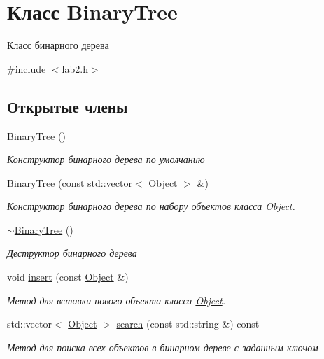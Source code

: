 \hypertarget{classBinaryTree}{}\section{Класс Binary\+Tree}
\label{classBinaryTree}


Класс бинарного дерева  




{\ttfamily \#include $<$lab2.\+h$>$}

\subsection*{Открытые члены}
\begin{DoxyCompactItemize}
\item 
\mbox{\label{classBinaryTree_adf45bce605436b26c353b87e27bffe50}} 
\mbox{\hyperlink{classBinaryTree_adf45bce605436b26c353b87e27bffe50}{Binary\+Tree}} ()
\begin{DoxyCompactList}\small\item\em Конструктор бинарного дерева по умолчанию \end{DoxyCompactList}\item 
\mbox{\hyperlink{classBinaryTree_a40a2af97186493b6bad3ee90e9a9c425}{Binary\+Tree}} (const std\+::vector$<$ \mbox{\hyperlink{structObject}{Object}} $>$ \&)
\begin{DoxyCompactList}\small\item\em Конструктор бинарного дерева по набору объектов класса \mbox{\hyperlink{structObject}{Object}}. \end{DoxyCompactList}\item 
\mbox{\label{classBinaryTree_a48c23a22a8400765d099e0e6fcebc236}} 
\mbox{\hyperlink{classBinaryTree_a48c23a22a8400765d099e0e6fcebc236}{$\sim$\+Binary\+Tree}} ()
\begin{DoxyCompactList}\small\item\em Деструктор бинарного дерева \end{DoxyCompactList}\item 
void \mbox{\hyperlink{classBinaryTree_af3d8f80f5451cbacb0338fa533d135ac}{insert}} (const \mbox{\hyperlink{structObject}{Object}} \&)
\begin{DoxyCompactList}\small\item\em Метод для вставки нового объекта класса \mbox{\hyperlink{structObject}{Object}}. \end{DoxyCompactList}\item 
std\+::vector$<$ \mbox{\hyperlink{structObject}{Object}} $>$ \mbox{\hyperlink{classBinaryTree_a15cfc97afa0ee9607b6c216f7e8d5e3c}{search}} (const std\+::string \&) const
\begin{DoxyCompactList}\small\item\em Метод для поиска всех объектов в бинарном дереве с заданным ключом \end{DoxyCompactList}\end{DoxyCompactItemize}


